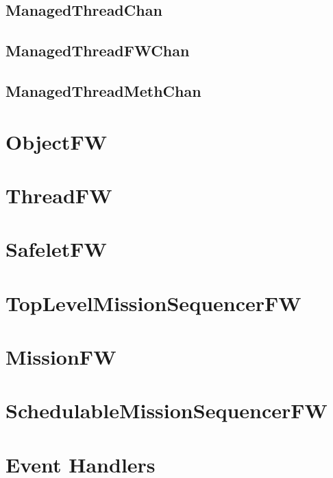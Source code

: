 \documentclass{article}
\begin{document}
\begin{plumbing}
\subsection{ManagedThreadChan}


\subsection{ManagedThreadFWChan}


\subsection{ManagedThreadMethChan}

\newpage
\end{plumbing}

\section{ObjectFW}

\newpage

\section{ThreadFW}

\newpage

\section{SafeletFW}

\newpage

\section{TopLevelMissionSequencerFW}

\newpage

\section{MissionFW}

\newpage

\section{SchedulableMissionSequencerFW}

\newpage

\section{Event Handlers}
\end{document}
